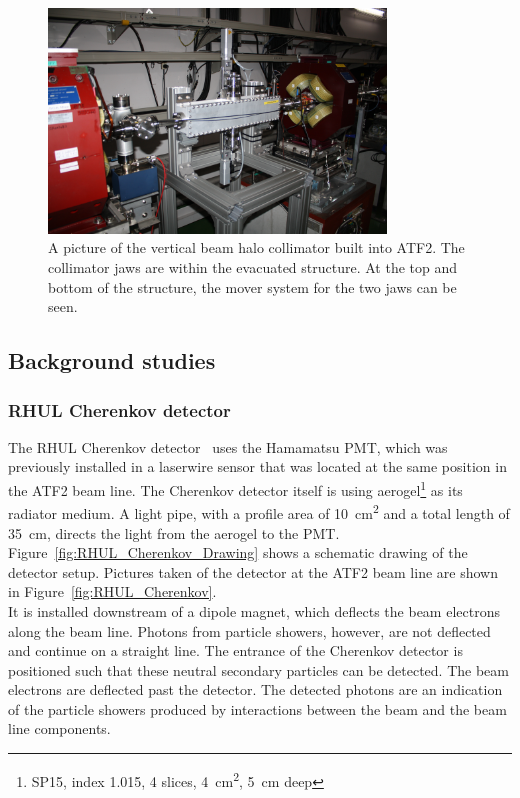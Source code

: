 \begin{figure}
\centering
\includegraphics[width=0.8\textwidth]{Figures/ATF/Installed_Collimator.jpg}
\caption[Picture of the installed beam halo collimator]{A picture of the vertical beam halo collimator built into ATF2. 
The collimator jaws are within the evacuated structure. 
At the top and bottom of the structure, the mover system for the two jaws can be seen.}
\label{fig:installed_collimator}
\end{figure}

\subsection{Background studies}
\subsubsection{RHUL Cherenkov detector}
\label{RHUL}

The RHUL Cherenkov detector~\cite{RHUL_detector_wiki} uses the Hamamatsu PMT, which was previously installed in a laserwire sensor that was located at the same position in the ATF2 beam line. 
The Cherenkov detector itself is using aerogel\footnote{SP15, index 1.015, 4 slices, \SI{4}{\centi\meter\squared}, \SI{5}{\centi\meter} deep} as its radiator medium. 
A light  pipe, with a profile area of \SI{10}{\centi\metre\squared} and a total length of \SI{35}{\centi\metre}, directs the light from the aerogel to the PMT.
Figure~\ref{fig:RHUL_Cherenkov_Drawing} shows a schematic drawing of the detector setup.
Pictures taken of the detector at the ATF2 beam line are shown in Figure~\ref{fig:RHUL_Cherenkov}.
\\It is installed downstream of a dipole magnet, which deflects the beam electrons along the beam line.
Photons from particle showers, however, are not deflected and continue on a straight line.
The entrance of the Cherenkov detector is positioned such that these neutral secondary particles can be detected.
The beam electrons are deflected past the detector.
The detected photons are an indication of the particle showers produced by interactions between the beam and the beam line components.

